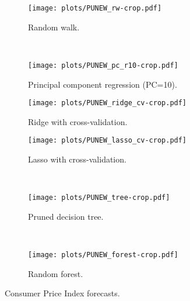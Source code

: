 \documentclass[a4paper,11pt]{scrartcl}
\begin{document}
\begin{figure}
    \centering
    \begin{subfigure}[b]{0.48\textwidth}
        \texttt{[image: plots/PUNEW\_rw-crop.pdf]}
        \caption{Random walk.}
        \label{fig:PUNEW_rw}
    \end{subfigure} ~
    \vspace{0.7cm}
    \begin{subfigure}[b]{0.48\textwidth}
        \texttt{[image: plots/PUNEW\_pc\_r10-crop.pdf]}
        \caption{Principal component regression (PC=10).}
        \label{fig:PUNEW_pc}
    \end{subfigure}
    \vspace{0.7cm}
    \begin{subfigure}[b]{0.48\textwidth}
        \texttt{[image: plots/PUNEW\_ridge\_cv-crop.pdf]}
        \caption{Ridge with cross-validation.}
        \label{fig:PUNEW_ridge}
    \end{subfigure}
    \begin{subfigure}[b]{0.48\textwidth}
        \texttt{[image: plots/PUNEW\_lasso\_cv-crop.pdf]}
        \caption{Lasso with cross-validation.}
        \label{fig:PUNEW_lasso}
    \end{subfigure} ~
    \begin{subfigure}[b]{0.48\textwidth}
        \texttt{[image: plots/PUNEW\_tree-crop.pdf]}
        \caption{Pruned decision tree.}
        \label{fig:PUNEW_tree}
    \end{subfigure} ~
    \begin{subfigure}[b]{0.48\textwidth}
        \texttt{[image: plots/PUNEW\_forest-crop.pdf]}
        \caption{Random forest.}
        \label{fig:PUNEW_forest}
    \end{subfigure}
    \caption{Consumer Price Index forecasts.}
    \label{fig:PUNEW}
\end{figure}

%
%
\end{document}
